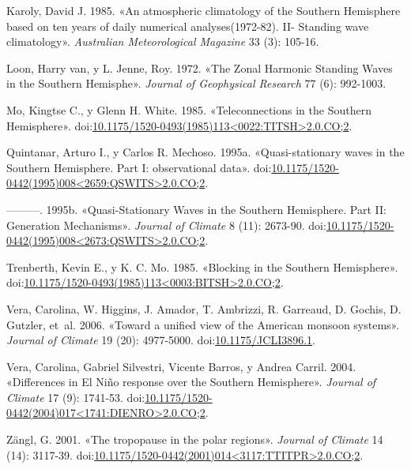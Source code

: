 \documentclass[spanish,a4paper]{book}
\begin{document}
\hypertarget{ref-Karoly1985}{}
Karoly, David J. 1985. «An atmospheric climatology of the Southern
Hemisphere based on ten years of daily numerical analyses(1972-82). II-
Standing wave climatology». \emph{Australian Meteorological Magazine} 33
(3): 105-16.

\hypertarget{ref-Loon1972}{}
Loon, Harry van, y L. Jenne, Roy. 1972. «The Zonal Harmonic Standing
Waves in the Southern Hemisphe». \emph{Journal of Geophysical Research}
77 (6): 992-1003.

\hypertarget{ref-Mo1985}{}
Mo, Kingtse C., y Glenn H. White. 1985. «Teleconnections in the Southern
Hemisphere».
doi:\href{https://doi.org/10.1175/1520-0493(1985)113\%3C0022:TITSH\%3E2.0.CO;2}{10.1175/1520-0493(1985)113\textless{}0022:TITSH\textgreater{}2.0.CO;2}.

\hypertarget{ref-Quintanar1995a}{}
Quintanar, Arturo I., y Carlos R. Mechoso. 1995a. «Quasi-stationary
waves in the Southern Hemisphere. Part I: observational data».
doi:\href{https://doi.org/10.1175/1520-0442(1995)008\%3C2659:QSWITS\%3E2.0.CO;2}{10.1175/1520-0442(1995)008\textless{}2659:QSWITS\textgreater{}2.0.CO;2}.

\hypertarget{ref-Quintanar1995}{}
---------. 1995b. «Quasi-Stationary Waves in the Southern Hemisphere.
Part II: Generation Mechanisms». \emph{Journal of Climate} 8 (11):
2673-90.
doi:\href{https://doi.org/10.1175/1520-0442(1995)008\%3C2673:QSWITS\%3E2.0.CO;2}{10.1175/1520-0442(1995)008\textless{}2673:QSWITS\textgreater{}2.0.CO;2}.

\hypertarget{ref-Trenberth1985}{}
Trenberth, Kevin E., y K. C. Mo. 1985. «Blocking in the Southern
Hemisphere».
doi:\href{https://doi.org/10.1175/1520-0493(1985)113\%3C0003:BITSH\%3E2.0.CO;2}{10.1175/1520-0493(1985)113\textless{}0003:BITSH\textgreater{}2.0.CO;2}.

\hypertarget{ref-Vera2006}{}
Vera, Carolina, W. Higgins, J. Amador, T. Ambrizzi, R. Garreaud, D.
Gochis, D. Gutzler, et~al. 2006. «Toward a unified view of the American
monsoon systems». \emph{Journal of Climate} 19 (20): 4977-5000.
doi:\href{https://doi.org/10.1175/JCLI3896.1}{10.1175/JCLI3896.1}.

\hypertarget{ref-Vera2004}{}
Vera, Carolina, Gabriel Silvestri, Vicente Barros, y Andrea Carril.
2004. «Differences in El Niño response over the Southern Hemisphere».
\emph{Journal of Climate} 17 (9): 1741-53.
doi:\href{https://doi.org/10.1175/1520-0442(2004)017\%3C1741:DIENRO\%3E2.0.CO;2}{10.1175/1520-0442(2004)017\textless{}1741:DIENRO\textgreater{}2.0.CO;2}.

\hypertarget{ref-Zangl2001}{}
Zängl, G. 2001. «The tropopause in the polar regions». \emph{Journal of
Climate} 14 (14): 3117-39.
doi:\href{https://doi.org/10.1175/1520-0442(2001)014\%3C3117:TTITPR\%3E2.0.CO;2}{10.1175/1520-0442(2001)014\textless{}3117:TTITPR\textgreater{}2.0.CO;2}.
\end{document}
